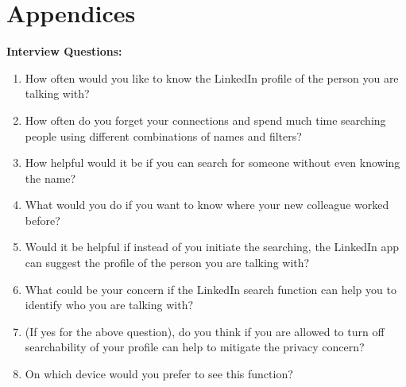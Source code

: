 \documentclass[
	letterpaper, %
]{jdf}
\begin{document}
\section{Appendices}
\textbf{Interview Questions:}
\begin{enumerate}
    \item How often would you like to know the LinkedIn profile of the person you are talking with?
    \item How often do you forget your connections and spend much time searching people using different combinations of names and filters?
    \item How helpful would it be if you can search for someone without even knowing the name?
    \item What would you do if you want to know where your new colleague worked before?
    \item Would it be helpful if instead of you initiate the searching, the LinkedIn app can suggest the profile of the person you are talking with?
    \item What could be your concern if the LinkedIn search function can help you to identify who you are talking with?
    \item (If yes for the above question), do you think if you are allowed to turn off searchability of your profile can help to mitigate the privacy concern?
    \item On which device would you prefer to see this function?
\end{enumerate}
\end{document}
